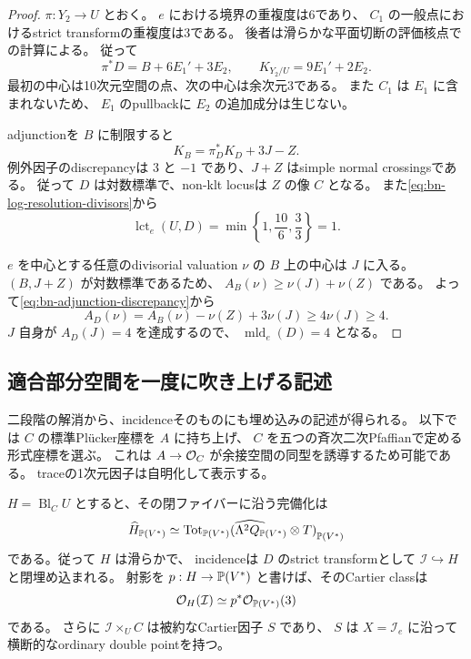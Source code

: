 \begin{proof}
$\pi:Y_2\to U$ とおく。
$e$ における境界の重複度は6であり、
$C_1$ の一般点におけるstrict transformの重複度は3である。
後者は滑らかな平面切断の評価核点での計算による。
従って
\begin{equation}\label{eq:bn-log-resolution-divisors}
 \pi^*D=B+6E_1'+3E_2,\qquad K_{Y_2/U}=9E_1'+2E_2.
\end{equation}
最初の中心は10次元空間の点、次の中心は余次元3である。
また $C_1$ は $E_1$ に含まれないため、
$E_1$ のpullbackに $E_2$ の追加成分は生じない。

adjunctionを $B$ に制限すると
\begin{equation}\label{eq:bn-adjunction-discrepancy}
 K_B=\pi_D^*K_D+3J-Z.
\end{equation}
例外因子のdiscrepancyは $3$ と $-1$ であり、$J+Z$ はsimple normal crossingsである。
従って $D$ は対数標準で、non-klt locusは $Z$ の像 $C$ となる。
また\eqref{eq:bn-log-resolution-divisors}から
\[
 \operatorname{lct}_e(U,D)
 =\min\left\{1,\frac{10}{6},\frac{3}{3}\right\}=1.
\]

$e$ を中心とする任意のdivisorial valuation $\nu$ の $B$ 上の中心は $J$ に入る。
$(B,J+Z)$ が対数標準であるため、
$A_B(\nu)\ge\nu(J)+\nu(Z)$ である。
よって\eqref{eq:bn-adjunction-discrepancy}から
\[
 A_D(\nu)=A_B(\nu)-\nu(Z)+3\nu(J)\ge4\nu(J)\ge4.
\]
$J$ 自身が $A_D(J)=4$ を達成するので、
$\operatorname{mld}_e(D)=4$ となる。
\end{proof}

\subsection{適合部分空間を一度に吹き上げる記述}

二段階の解消から、incidenceそのものにも埋め込みの記述が得られる。
以下では $C$ の標準Pl\"ucker座標を $A$ に持ち上げ、
$C$ を五つの斉次二次Pfaffianで定める形式座標を選ぶ。
これは $A\to\mathcal O_C$ が余接空間の同型を誘導するため可能である。
traceの1次元因子は自明化して表示する。

\begin{theorem}[適合部分空間のblowup内のincidence]\label{thm:bn-single-blowup}
$H=\operatorname{Bl}_C U$ とすると、その閉ファイバーに沿う完備化は
\[
 \widehat H_{\mathbb P(V^*)}
 \simeq
 \widehat{\operatorname{Tot}_{\mathbb P(V^*)}
        (\Lambda^2Q_{\mathbb P(V^*)}\otimes T)}_{\mathbb P(V^*)}
\]
である。従って $H$ は滑らかで、
incidenceは $D$ のstrict transformとして $\mathcal I\hookrightarrow H$
と閉埋め込まれる。
射影を $p:H\to\mathbb P(V^*)$ と書けば、そのCartier classは
\[
 \mathcal O_H(\mathcal I)\simeq p^*\mathcal O_{\mathbb P(V^*)}(3)
\]
である。
さらに $\mathcal I\times_U C$ は被約なCartier因子 $S$ であり、
$S$ は $X=\mathcal I_e$ に沿って横断的なordinary double pointを持つ。
\end{theorem}

